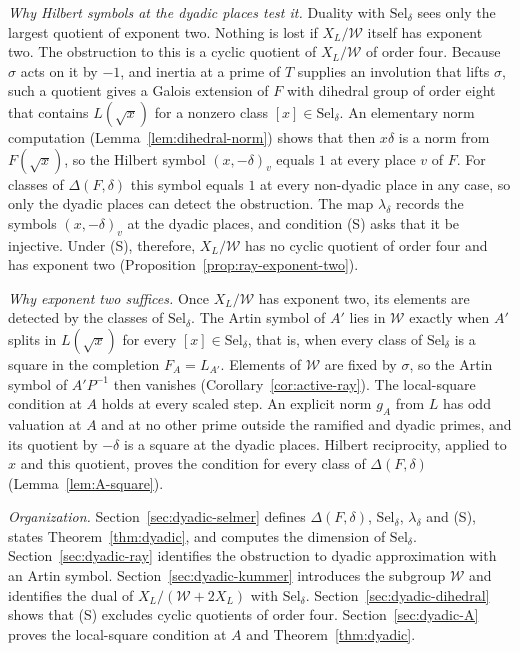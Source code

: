 \documentclass[11pt]{article}
\theoremstyle{plain}
\theoremstyle{definition}
\theoremstyle{remark}
\begin{document}
\emph{Why Hilbert symbols at the dyadic places test it.}  Duality with
$\mathrm{Sel}_\delta$ sees only the largest quotient of exponent two.
Nothing is lost if $X_L/\mathcal W$ itself has exponent two.  The
obstruction to this is a cyclic quotient of $X_L/\mathcal W$ of order
four.  Because $\sigma$ acts on it by $-1$, and inertia at a prime of $T$
supplies an involution that lifts $\sigma$, such a quotient gives a
Galois extension of $F$ with dihedral group of order eight that contains
$L(\sqrt x)$ for a nonzero class $[x]\in\mathrm{Sel}_\delta$.  An
elementary norm computation (Lemma~\ref{lem:dihedral-norm}) shows that
then $x\delta$ is a norm from $F(\sqrt x)$, so the Hilbert symbol
$(x,-\delta)_v$ equals $1$ at every place $v$ of $F$.  For classes of
$\Delta(F,\delta)$ this symbol equals $1$ at every non-dyadic place in
any case, so only the dyadic places can detect the obstruction.  The map
$\lambda_\delta$ records the symbols $(x,-\delta)_v$ at the dyadic places,
and condition (S) asks that it be injective.  Under (S), therefore,
$X_L/\mathcal W$ has no cyclic quotient of order four and has exponent two
(Proposition~\ref{prop:ray-exponent-two}).

\emph{Why exponent two suffices.}  Once $X_L/\mathcal W$ has exponent two,
its elements are detected by the classes of $\mathrm{Sel}_\delta$.  The
Artin symbol of $A'$ lies in $\mathcal W$ exactly when $A'$ splits in
$L(\sqrt x)$ for every $[x]\in\mathrm{Sel}_\delta$, that is, when every
class of $\mathrm{Sel}_\delta$ is a square in the completion
$F_A=L_{A'}$.  Elements of $\mathcal W$ are fixed by $\sigma$, so the
Artin symbol of $A'P^{-1}$ then vanishes
(Corollary~\ref{cor:active-ray}).  The local-square condition at $A$
holds at every scaled step.  An explicit norm $g_A$ from $L$ has odd
valuation at $A$ and at no other prime outside the ramified and dyadic
primes, and its quotient by $-\delta$ is a square at the dyadic places.
Hilbert reciprocity, applied to $x$ and this quotient, proves the
condition for every class of $\Delta(F,\delta)$
(Lemma~\ref{lem:A-square}).

\emph{Organization.}  Section~\ref{sec:dyadic-selmer} defines
$\Delta(F,\delta)$, $\mathrm{Sel}_\delta$, $\lambda_\delta$ and (S),
states Theorem~\ref{thm:dyadic}, and computes the dimension of
$\mathrm{Sel}_\delta$.  Section~\ref{sec:dyadic-ray} identifies the
obstruction to dyadic approximation with an Artin symbol.
Section~\ref{sec:dyadic-kummer} introduces the subgroup $\mathcal W$ and
identifies the dual of $X_L/(\mathcal W+2X_L)$ with $\mathrm{Sel}_\delta$.
Section~\ref{sec:dyadic-dihedral} shows that (S) excludes cyclic quotients
of order four.  Section~\ref{sec:dyadic-A} proves the local-square
condition at $A$ and Theorem~\ref{thm:dyadic}.
\end{document}

